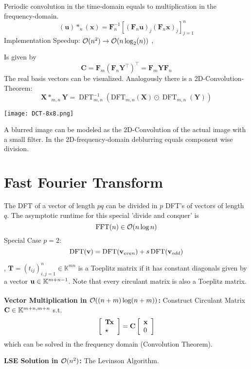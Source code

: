 Periodic convolution in the time-domain equals to multiplication in the frequency-domain.
$$
(\mathbf{u}) *_{n}(\mathbf{x})=\mathbf{F}_{n}^{-1}\left[\left(\mathbf{F}_{n} \mathbf{u}\right)_{j}\left(\mathbf{F}_{n} \mathbf{x}\right)_{j}\right]_{j=1}^{n}
$$
Implementation Speedup: $\mathcal{O}(n^2) \rightarrow \mathcal{O}(n \log_2(n))$
\sep

\Theorem[2D DFT] Is given by 
$$
\mathbf{C}=\mathbf{F}_{m}\left(\mathbf{F}_{n} \mathbf{Y}^{\top}\right)^{\top}=\mathbf{F}_{m} \mathbf{Y} \mathbf{F}_{n}
$$
The real basis vectors can be visualized.
Analogously there is a 2D-Convolution-Theorem:
$$
\mathbf{X} *_{m, n} \mathbf{Y}=\operatorname{DFT}_{m, n}^{-1}\left(\mathrm{DFT}_{m, n}(\mathbf{X}) \odot \operatorname{DFT}_{m, n}(\mathbf{Y})\right)
$$
\begin{center}
\texttt{[image: DCT-8x8.png]}
\end{center}

 A blurred image can be modeled as the 2D-Convolution of the actual image with a small filter. In the 2D-frequency-domain deblurring equals component wise division.

\section{Fast Fourier Transform}
The DFT of a vector of length $pq$ can be divided in $p$ DFT's of vectors of length $q$. The asymptotic runtime for this special 'divide and conquer' is
$$\operatorname{FFT}(n) \in \mathcal{O}(n \log n)$$
Special Case $p=2$: 
$$\operatorname{DFT}(\mathbf{v}) = \operatorname{DFT}(\mathbf{v}_{even})+s \operatorname{DFT}(\mathbf{v}_{odd})$$

\sep
{} $\mathbf{T}=\left(t_{i j}\right)_{i, j=1}^{n} \in \mathbb{K}^{mn}$
is a Toeplitz matrix if it has constant diagonals given by a vector $\mathbf{u} \in \mathbb{K}^{m+n-1}$. Note that every circulant matrix is also a Toeplitz matrix.\\

 \\
\textbf{Vector Multiplication in $\mathcal{O}((n+m)\log(n+m))$: }
Construct Circulant Matrix $\mathbf{C} \in \mathbb{K}^{m+n, m+n}$ s.t.
$$\left[\begin{array}{l} \mathbf{T}\mathbf{x} \\ \star \end{array}\right] = \mathbf{C} \left[\begin{array}{l} \mathbf{x} \\0\end{array}\right]$$
which can be solved in the frequency domain (Convolution Theorem).

\textbf{LSE Solution in $\mathcal{O}(n^2)$: }
The Levinson Algorithm.
